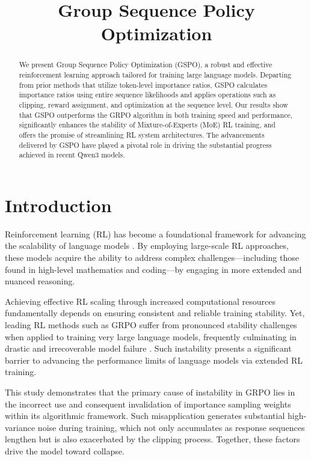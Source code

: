 \title{Group Sequence Policy Optimization}

\begin{abstract}
We present Group Sequence Policy Optimization (GSPO), a robust and effective reinforcement learning approach tailored for training large language models. Departing from prior methods that utilize token-level importance ratios, GSPO calculates importance ratios using entire sequence likelihoods and applies operations such as clipping, reward assignment, and optimization at the sequence level. Our results show that GSPO outperforms the GRPO algorithm in both training speed and performance, significantly enhances the stability of Mixture-of-Experts (MoE) RL training, and offers the promise of streamlining RL system architectures. The advancements delivered by GSPO have played a pivotal role in driving the substantial progress achieved in recent Qwen3 models.
\end{abstract}

\section{Introduction}
\label{sec:intro}

Reinforcement learning (RL) has become a foundational framework for advancing the scalability of language models \citep{o1,dpsk-r1,qwq32b,qwen3}. By employing large-scale RL approaches, these models acquire the ability to address complex challenges—including those found in high-level mathematics and coding—by engaging in more extended and nuanced reasoning.

Achieving effective RL scaling through increased computational resources fundamentally depends on ensuring consistent and reliable training stability. Yet, leading RL methods such as GRPO \citep{grpo} suffer from pronounced stability challenges when applied to training very large language models, frequently culminating in drastic and irrecoverable model failure \citep{qwen3, minimax-m1}. Such instability presents a significant barrier to advancing the performance limits of language models via extended RL training.

This study demonstrates that the primary cause of instability in GRPO lies in the incorrect use and consequent invalidation of importance sampling weights within its algorithmic framework. Such misapplication generates substantial high-variance noise during training, which not only accumulates as response sequences lengthen but is also exacerbated by the clipping process. Together, these factors drive the model toward collapse.

